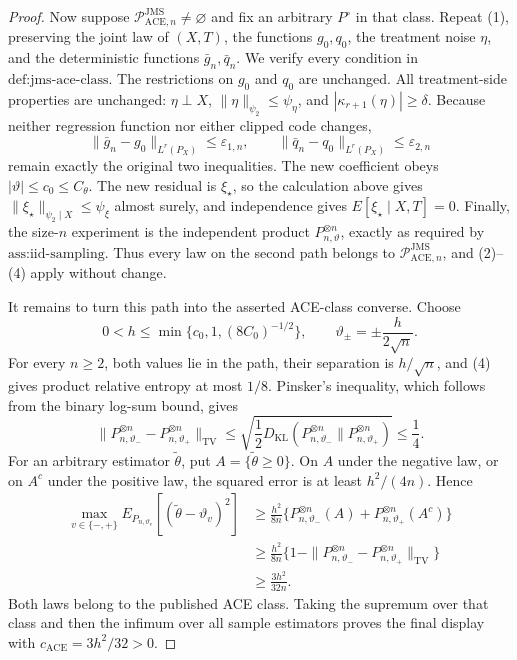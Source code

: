 \documentclass{article}
\begin{document}
\begin{proof}
Now suppose \(\mathcal P_{\mathrm{ACE},n}^{\mathrm{JMS}}\neq\varnothing\) and fix an arbitrary \(P^{\circ}\) in that class. Repeat (1), preserving the joint law of \((X,T)\), the functions \(g_0,q_0\), the treatment noise \(\eta\), and the deterministic functions \(\bar g_n,\bar q_n\). We verify every condition in \(\text{def:jms-ace-class}\). The restrictions on \(g_0\) and \(q_0\) are unchanged. All treatment-side properties are unchanged: \(\eta\perp X\), \(\|\eta\|_{\psi_2}\le\psi_{\eta}\), and \(|\kappa_{r+1}(\eta)|\ge\delta\). Because neither regression function nor either clipped code changes,
\[
 \|\bar g_n-g_0\|_{L^r(P_X)}\le\varepsilon_{1,n},
 \qquad
 \|\bar q_n-q_0\|_{L^r(P_X)}\le\varepsilon_{2,n}
\]
remain exactly the original two inequalities. The new coefficient obeys \(|\vartheta|\le c_0\le C_{\theta}\). The new residual is \(\xi_{\star}\), so the calculation above gives \(\|\xi_{\star}\|_{\psi_2\mid X}\le\psi_{\xi}\) almost surely, and independence gives \(E[\xi_{\star}\mid X,T]=0\). Finally, the size-\(n\) experiment is the independent product \(P_{n,\vartheta}^{\otimes n}\), exactly as required by \(\text{ass:iid-sampling}\). Thus every law on the second path belongs to \(\mathcal P_{\mathrm{ACE},n}^{\mathrm{JMS}}\), and (2)--(4) apply without change.

It remains to turn this path into the asserted ACE-class converse. Choose
\[
 0<h\le\min\{c_0,1,(8C_0)^{-1/2}\},
 \qquad
 \vartheta_{\pm}=\pm\frac{h}{2\sqrt n}.
\]
For every \(n\ge2\), both values lie in the path, their separation is \(h/\sqrt n\), and (4) gives product relative entropy at most \(1/8\). Pinsker's inequality, which follows from the binary log-sum bound, gives
\[
 \|P_{n,\vartheta_-}^{\otimes n}-P_{n,\vartheta_+}^{\otimes n}\|_{\mathrm{TV}}
 \le\sqrt{\frac12D_{\mathrm{KL}}(P_{n,\vartheta_-}^{\otimes n}\|P_{n,\vartheta_+}^{\otimes n})}
 \le\frac14.
 \tag{5}
\]
For an arbitrary estimator \(\widetilde\theta\), put \(A=\{\widetilde\theta\ge0\}\). On \(A\) under the negative law, or on \(A^c\) under the positive law, the squared error is at least \(h^2/(4n)\). Hence
\[
\begin{aligned}
 \max_{v\in\{-,+\}}
 E_{P_{n,\vartheta_v}}[(\widetilde\theta-\vartheta_v)^2]
 &\ge \frac{h^2}{8n}
 \{P_{n,\vartheta_-}^{\otimes n}(A)
   +P_{n,\vartheta_+}^{\otimes n}(A^c)\}\\
 &\ge \frac{h^2}{8n}
 \{1-\|P_{n,\vartheta_-}^{\otimes n}-P_{n,\vartheta_+}^{\otimes n}\|_{\mathrm{TV}}\}\\
 &\ge\frac{3h^2}{32n}.
\end{aligned}
\]
Both laws belong to the published ACE class. Taking the supremum over that class and then the infimum over all sample estimators proves the final display with \(c_{\mathrm{ACE}}=3h^2/32>0\).
\end{proof}
\end{document}
